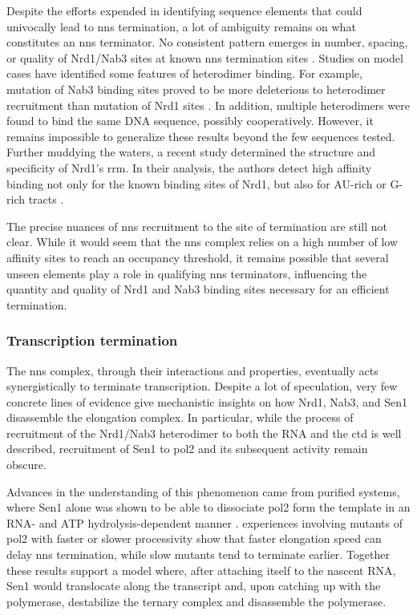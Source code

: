 Despite the efforts expended in identifying sequence elements that could univocally lead to \gls{nns} termination, a lot of ambiguity remains on what constitutes an \gls{nns} terminator.
No consistent pattern emerges in number, spacing, or quality of Nrd1/Nab3 sites at known \gls{nns} termination sites \invivo{}. 
Studies on model cases have identified some features of heterodimer binding. 
For example, mutation of Nab3 binding sites proved to be more deleterious to heterodimer recruitment than mutation of Nrd1 sites \cite{carroll:2007:interaction}.
In addition, multiple heterodimers were found to bind the same DNA sequence, possibly cooperatively\cite{carroll:2007:interaction}.
However, it remains impossible to generalize these results beyond the few sequences tested.
Further muddying the waters, a recent \invitro{} study determined the structure and specificity of Nrd1's \gls{rrm}.
In their analysis, the authors detect high affinity binding not only for the known binding sites of Nrd1, but also for AU-rich or G-rich tracts \cite{bacikova:2014:structure}.

The precise nuances of \gls{nns} recruitment to the site of termination are still not clear. 
While it would seem that the \gls{nns} complex relies on a high number of low affinity sites to reach an occupancy threshold, it remains possible that several unseen elements play a role in qualifying \gls{nns} terminators, influencing the quantity and quality of Nrd1 and Nab3 binding sites necessary for an efficient termination.


\subsubsection{Transcription termination}

The \gls{nns} complex, through their interactions and properties, eventually acts synergistically to terminate transcription.
Despite a lot of speculation, very few concrete lines of evidence give mechanistic insights on how Nrd1, Nab3, and Sen1 disassemble the elongation complex.
In particular, while the process of recruitment of the Nrd1/Nab3 heterodimer to both the RNA and the \gls{ctd} is well described, recruitment of Sen1 to \gls{pol2} and its subsequent activity remain obscure.

Advances in the understanding of this phenomenon came from \invitro{} purified systems, where Sen1 alone was shown to be able to dissociate \gls{pol2} form the template in an RNA- and ATP hydrolysis-dependent manner \cite{porrua:2013:bacteriallike}. 
\Invivo{} experiences involving mutants of \gls{pol2} with faster or slower processivity show that faster elongation speed can delay \gls{nns} termination, while slow mutants tend to terminate earlier.
Together these results support a model where, after attaching itself to the nascent RNA, Sen1 would translocate along the transcript and, upon catching up with the polymerase, destabilize the ternary complex and disassemble the polymerase.


